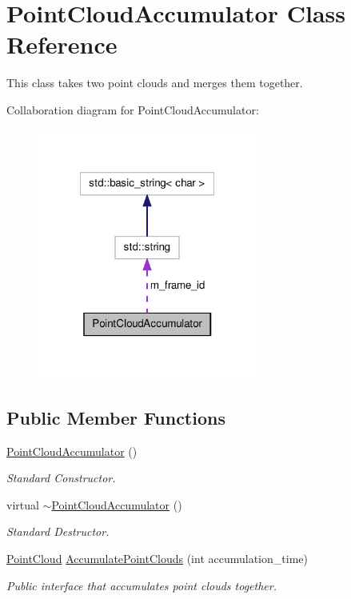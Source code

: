 \hypertarget{class_point_cloud_accumulator}{\section{\-Point\-Cloud\-Accumulator \-Class \-Reference}
\label{class_point_cloud_accumulator}
}


\-This class takes two point clouds and merges them together.  




\-Collaboration diagram for \-Point\-Cloud\-Accumulator\-:\nopagebreak
\begin{figure}[H]
\begin{center}
\leavevmode
\includegraphics[width=204pt]{class_point_cloud_accumulator__coll__graph}
\end{center}
\end{figure}
\subsection*{\-Public \-Member \-Functions}
\begin{DoxyCompactItemize}
\item 
\hyperlink{class_point_cloud_accumulator_a8eacc283828c55b809058b54fd082433}{\-Point\-Cloud\-Accumulator} ()
\begin{DoxyCompactList}\small\item\em \-Standard \-Constructor. \end{DoxyCompactList}\item 
virtual \hyperlink{class_point_cloud_accumulator_a48db4ff8ad89f27563691af475d8bc3a}{$\sim$\-Point\-Cloud\-Accumulator} ()
\begin{DoxyCompactList}\small\item\em \-Standard \-Destructor. \end{DoxyCompactList}\item 
\hyperlink{_helper_functions_8h_abb956d1047f4dd2c956fe3cb0dd0004d}{\-Point\-Cloud} \hyperlink{class_point_cloud_accumulator_a24d93cde9ce3cce292779934f2b97ede}{\-Accumulate\-Point\-Clouds} (int accumulation\-\_\-time)
\begin{DoxyCompactList}\small\item\em \-Public interface that accumulates point clouds together. \end{DoxyCompactList}\end{DoxyCompactItemize}
